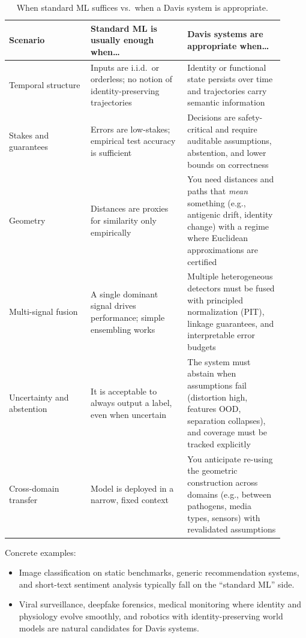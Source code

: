 \documentclass[11pt]{article}
\theoremstyle{remark}
\theoremstyle{plain}
\begin{document}
\begin{table}[H]
    \centering
    \caption{When standard ML suffices vs.\ when a Davis system is appropriate.}
    \label{tab:when-to-use}
    \begin{tabularx}{\linewidth}{@{}p{0.27\linewidth}p{0.32\linewidth}p{0.32\linewidth}@{}}
        \toprule
        \textbf{Scenario} & \textbf{Standard ML is usually enough when\dots} & \textbf{Davis systems are appropriate when\dots} \\
        \midrule
        Temporal structure & Inputs are i.i.d.\ or orderless; no notion of identity-preserving trajectories & Identity or functional state persists over time and trajectories carry semantic information \\
        \addlinespace[2pt]
        Stakes and guarantees & Errors are low-stakes; empirical test accuracy is sufficient & Decisions are safety-critical and require auditable assumptions, abstention, and lower bounds on correctness \\
        \addlinespace[2pt]
        Geometry & Distances are proxies for similarity only empirically & You need distances and paths that \emph{mean} something (e.g., antigenic drift, identity change) with a regime where Euclidean approximations are certified \\
        \addlinespace[2pt]
        Multi-signal fusion & A single dominant signal drives performance; simple ensembling works & Multiple heterogeneous detectors must be fused with principled normalization (PIT), linkage guarantees, and interpretable error budgets \\
        \addlinespace[2pt]
        Uncertainty and abstention & It is acceptable to always output a label, even when uncertain & The system must abstain when assumptions fail (distortion high, features OOD, separation collapses), and coverage must be tracked explicitly \\
        \addlinespace[2pt]
        Cross-domain transfer & Model is deployed in a narrow, fixed context & You anticipate re-using the geometric construction across domains (e.g., between pathogens, media types, sensors) with revalidated assumptions \\
        \bottomrule
    \end{tabularx}
\end{table}

Concrete examples:
\begin{itemize}[leftmargin=*]
    \item Image classification on static benchmarks, generic recommendation systems, and short-text sentiment analysis typically fall on the ``standard ML'' side.
    \item Viral surveillance, deepfake forensics, medical monitoring where identity and physiology evolve smoothly, and robotics with identity-preserving world models are natural candidates for Davis systems.
\end{itemize}
\end{document}
